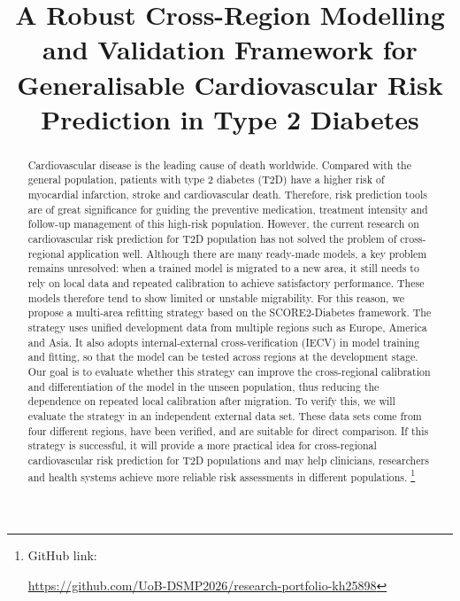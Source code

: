 \documentclass[conference]{IEEEtran}
\begin{document}
\title{A Robust Cross-Region Modelling and Validation Framework for Generalisable Cardiovascular Risk Prediction in Type 2 Diabetes}

\author{
}

\maketitle

\begin{abstract}
Cardiovascular disease is the leading cause of death worldwide. Compared with the general population, patients with type 2 diabetes (T2D) have a higher risk of myocardial infarction, stroke and cardiovascular death. Therefore, risk prediction tools are of great significance for guiding the preventive medication, treatment intensity and follow-up management of this high-risk population. However, the current research on cardiovascular risk prediction for T2D population has not solved the problem of cross-regional application well. Although there are many ready-made models, a key problem remains unresolved: when a trained model is migrated to a new area, it still needs to rely on local data and repeated calibration to achieve satisfactory performance. These models therefore tend to show limited or unstable migrability. For this reason, we propose a multi-area refitting strategy based on the SCORE2-Diabetes framework. The strategy uses unified development data from multiple regions such as Europe, America and Asia. It also adopts internal-external cross-verification (IECV) in model training and fitting, so that the model can be tested across regions at the development stage. Our goal is to evaluate whether this strategy can improve the cross-regional calibration and differentiation of the model in the unseen population, thus reducing the dependence on repeated local calibration after migration. To verify this, we will evaluate the strategy in an independent external data set. These data sets come from four different regions, have been verified, and are suitable for direct comparison. If this strategy is successful, it will provide a more practical idea for cross-regional cardiovascular risk prediction for T2D populations and may help clinicians, researchers and health systems achieve more reliable risk assessments in different populations. \footnote {GitHub link:

\url{https://github.com/UoB-DSMP2026/research-portfolio-kh25898}}

\end{abstract}
\end{document}
